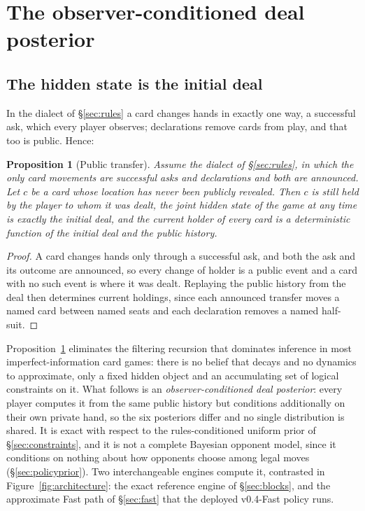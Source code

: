 \documentclass[11pt]{article}
\newtheorem{proposition}[theorem]{Proposition}
\theoremstyle{definition}
\DeclareRobustCommand{\vfast}{\texorpdfstring{\mbox{v0.4-Fast}}{v0.4-Fast}}
\begin{document}
\section{The observer-conditioned deal posterior}
\label{sec:belief}

\subsection{The hidden state is the initial deal}

In the dialect of \S\ref{sec:rules} a card changes hands in exactly one way, a
successful ask, which every player observes; declarations remove cards from
play, and that too is public. Hence:

\begin{proposition}[Public transfer]
\label{prop:transfer}
Assume the dialect of \S\ref{sec:rules}, in which the only card movements are
successful asks and declarations and both are announced. Let $c$ be a card whose
location has never been publicly revealed. Then $c$ is still held by the player to
whom it was dealt, the joint hidden state of the game at any time is exactly the
initial deal, and the current holder of every card is a deterministic function of
the initial deal and the public history.
\end{proposition}

\begin{proof}
A card changes hands only through a successful ask, and both the ask and its
outcome are announced, so every change of holder is a public event and a card
with no such event is where it was dealt. Replaying the public history from the
deal then determines current holdings, since each announced transfer moves a
named card between named seats and each declaration removes a named half-suit.
\end{proof}

Proposition~\ref{prop:transfer} eliminates the filtering recursion that
dominates inference in most imperfect-information card games: there is no
belief that decays and no dynamics to approximate, only a fixed hidden object
and an accumulating set of logical constraints on it. What follows is an
\emph{observer-conditioned deal posterior}: every player computes it from the
same public history but conditions additionally on their own private hand, so
the six posteriors differ and no single distribution is shared. It is exact
with respect to the rules-conditioned uniform prior of
\S\ref{sec:constraints}, and it is not a complete Bayesian opponent model,
since it conditions on nothing about how opponents choose among legal moves
(\S\ref{sec:policyprior}). Two interchangeable engines compute it, contrasted
in Figure~\ref{fig:architecture}: the exact reference engine of
\S\ref{sec:blocks}, and the approximate Fast path of \S\ref{sec:fast} that the
deployed \vfast{} policy runs.
\end{document}
